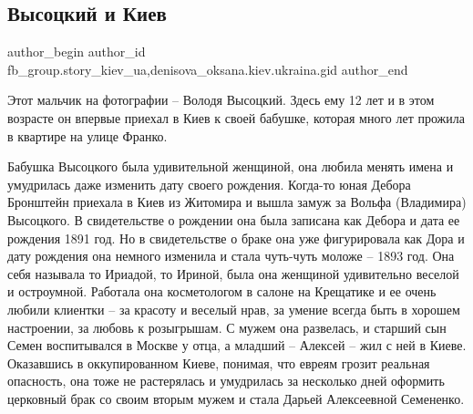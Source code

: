  
 
 
 
 
 
\subsection{Высоцкий и Киев}
\label{sec:25_01_2022.fb.fb_group.story_kiev_ua.1.vysockij_i_kiev}
 
\ifcmt
 author_begin
   author_id fb_group.story_kiev_ua,denisova_oksana.kiev.ukraina.gid
 author_end
\fi

Этот мальчик на фотографии – Володя Высоцкий. Здесь ему 12 лет и в этом
возрасте он впервые приехал в Киев к своей бабушке, которая много лет прожила в
квартире на улице Франко. 


Бабушка Высоцкого была удивительной женщиной, она любила менять имена и
умудрилась даже изменить дату своего рождения. Когда-то юная Дебора Бронштейн
приехала в Киев из Житомира и вышла замуж за Вольфа (Владимира) Высоцкого. В
свидетельстве о рождении она была записана как Дебора и дата ее рождения 1891
год. Но в свидетельстве о браке она уже фигурировала как Дора и дату рождения
она немного изменила и стала чуть-чуть моложе – 1893 год. Она себя называла то
Ириадой, то Ириной, была она женщиной удивительно веселой и остроумной.
Работала она косметологом в салоне на Крещатике и ее очень любили клиентки – за
красоту и веселый нрав, за умение всегда быть в хорошем настроении, за любовь к
розыгрышам. С мужем она развелась, и старший сын Семен воспитывался в Москве у
отца, а младший – Алексей – жил с ней в Киеве. Оказавшись в оккупированном
Киеве, понимая, что евреям грозит реальная опасность, она тоже не растерялась и
умудрилась за несколько дней оформить церковный брак со своим вторым мужем и
стала Дарьей Алексеевной Семененко.


